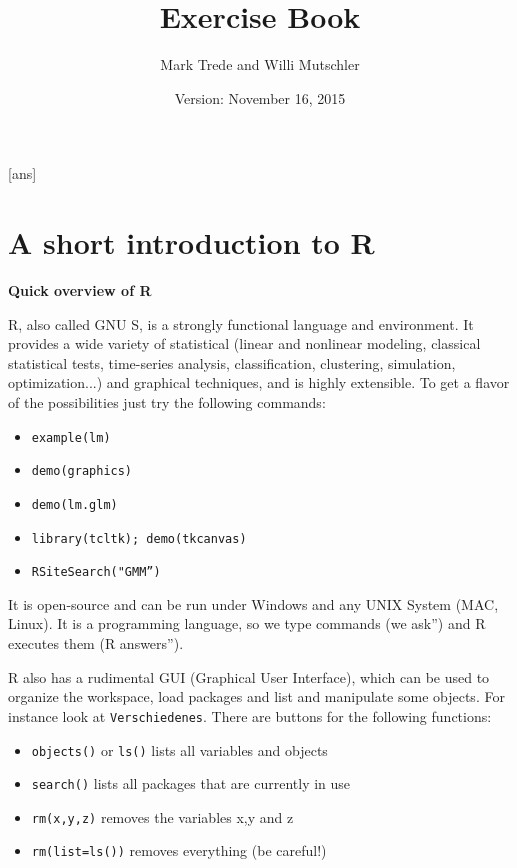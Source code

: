 \documentclass{article}
\begin{document}
\title{Exercise Book}
\author{Mark Trede and Willi Mutschler}
\date{Version: November 16, 2015}
\maketitle\thispagestyle{empty}
\newpage
{}[ans]
\renewcommand{\contentsname}{Overview of Exercises}
\tableofcontents\newpage

\setcounter{page}{1}
\section{A short introduction to R\label{introductionR}}

\begin{solution}
\textbf{Quick overview of R}

R, also called GNU S, is a strongly functional language and environment. It provides a wide variety of statistical (linear and nonlinear modeling, classical statistical tests, time-series analysis, classification, clustering, simulation, optimization...) and graphical techniques, and is highly extensible. To get a flavor of the possibilities just try the
following commands:

\begin{itemize}
\item \texttt{example(lm)}
\item \texttt{demo(graphics)}
\item \texttt{demo(lm.glm)}
\item \texttt{library(tcltk); demo(tkcanvas)}
\item \texttt{RSiteSearch("GMM\textquotedblright)}
\end{itemize}

It is open-source and can be run under Windows and any UNIX System (MAC, Linux). It is a programming language, so we type commands (\quotedblbase we ask\textquotedblright ) and R executes them (\quotedblbase R answers\textquotedblright ).

R also has a rudimental GUI (Graphical User Interface), which can be used to organize the workspace, load packages and list and manipulate some objects. For instance look at \texttt{Verschiedenes}. There are buttons for the following functions:
\begin{itemize}
  \item \texttt{objects()} or \texttt{ls()} lists all variables and
      objects
  \item \texttt{search()} lists all packages that are currently in use
  \item \texttt{rm(x,y,z)} removes the variables x,y and z
  \item \texttt{rm(list=ls())} removes everything (be careful!)
\end{itemize}


\end{solution}
\end{document}

